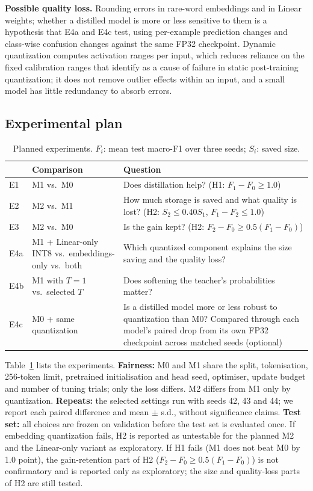 \documentclass[11pt]{article}
\begin{document}
\textbf{Possible quality loss.} Rounding errors in rare-word embeddings and in Linear weights; whether a distilled model is more or less sensitive to them is a hypothesis that E4a and E4c test, using per-example prediction changes and class-wise confusion changes against the same FP32 checkpoint. Dynamic quantization computes activation ranges per input, which reduces reliance on the fixed calibration ranges that \citet{bondarenko} identify as a cause of failure in static post-training quantization; it does not remove outlier effects within an input, and a small model has little redundancy to absorb errors.

\subsection{Experimental plan}
\begin{table}[t]
\centering\small
\begin{tabularx}{\columnwidth}{@{}l>{\raggedright\arraybackslash}p{1.6cm}>{\raggedright\arraybackslash}X@{}}
\toprule
& Comparison & Question \\
\midrule
E1 & M1 vs.\ M0 & Does distillation help? (H1: $F_1-F_0\geq1.0$) \\
E2 & M2 vs.\ M1 & How much storage is saved and what quality is lost? (H2: $S_2\leq0.40S_1$, $F_1-F_2\leq1.0$) \\
E3 & M2 vs.\ M0 & Is the gain kept? (H2: $F_2-F_0\geq0.5(F_1-F_0)$) \\
E4a & M1 + Linear-only INT8 vs.\ embeddings-only vs.\ both & Which quantized component explains the size saving and the quality loss? \\
E4b & M1 with $T{=}1$ vs.\ selected $T$ & Does softening the teacher's probabilities matter? \\
E4c & M0 + same quantization & Is a distilled model more or less robust to quantization than M0? Compared through each model's paired drop from its own FP32 checkpoint across matched seeds (optional) \\
\bottomrule
\end{tabularx}
\caption{Planned experiments. $F_i$: mean test macro-F1 over three seeds; $S_i$: saved size.}
\label{tab:exp}
\end{table}

Table~\ref{tab:exp} lists the experiments. \textbf{Fairness:} M0 and M1 share the split, tokenisation, 256-token limit, pretrained initialisation and head seed, optimiser, update budget and number of tuning trials; only the loss differs. M2 differs from M1 only by quantization. \textbf{Repeats:} the selected settings run with seeds 42, 43 and 44; we report each paired difference and mean $\pm$ s.d., without significance claims. \textbf{Test set:} all choices are frozen on validation before the test set is evaluated once. If embedding quantization fails, H2 is reported as untestable for the planned M2 and the Linear-only variant as exploratory. If H1 fails (M1 does not beat M0 by 1.0 point), the gain-retention part of H2 ($F_2-F_0\geq0.5(F_1-F_0)$) is not confirmatory and is reported only as exploratory; the size and quality-loss parts of H2 are still tested.
\end{document}
